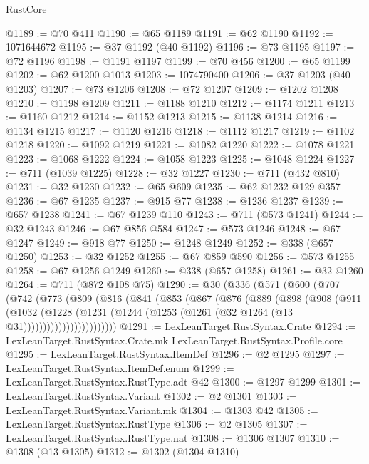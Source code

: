 \begin{lexlean}{RustCore}
\begin{coremodule}
@1189 := @70 @411
@1190 := @65 @1189
@1191 := @62 @1190
@1192 := 1071644672
@1195 := @37 @1192 (@40 @1192)
@1196 := @73 @1195
@1197 := @72 @1196
@1198 := @1191 @1197
@1199 := @70 @456
@1200 := @65 @1199
@1202 := @62 @1200 @1013
@1203 := 1074790400
@1206 := @37 @1203 (@40 @1203)
@1207 := @73 @1206
@1208 := @72 @1207
@1209 := @1202 @1208
@1210 := @1198 @1209
@1211 := @1188 @1210
@1212 := @1174 @1211
@1213 := @1160 @1212
@1214 := @1152 @1213
@1215 := @1138 @1214
@1216 := @1134 @1215
@1217 := @1120 @1216
@1218 := @1112 @1217
@1219 := @1102 @1218
@1220 := @1092 @1219
@1221 := @1082 @1220
@1222 := @1078 @1221
@1223 := @1068 @1222
@1224 := @1058 @1223
@1225 := @1048 @1224
@1227 := @711 (@1039 @1225)
@1228 := @32 @1227
@1230 := @711 (@432 @810)
@1231 := @32 @1230
@1232 := @65 @609
@1235 := @62 @1232 @129 @357
@1236 := @67 @1235
@1237 := @915 @77
@1238 := @1236 @1237
@1239 := @657 @1238
@1241 := @67 @1239 @110
@1243 := @711 (@573 @1241)
@1244 := @32 @1243
@1246 := @67 @856 @584
@1247 := @573 @1246
@1248 := @67 @1247
@1249 := @918 @77
@1250 := @1248 @1249
@1252 := @338 (@657 @1250)
@1253 := @32 @1252
@1255 := @67 @859 @590
@1256 := @573 @1255
@1258 := @67 @1256 @1249
@1260 := @338 (@657 @1258)
@1261 := @32 @1260
@1264 := @711 (@872 @108 @75)
@1290 := @30
    (@336
      (@571
        (@600
          (@707
            (@742
              (@773
                (@809
                  (@816
                    (@841
                      (@853
                        (@867
                          (@876
                            (@889
                              (@898
                                (@908
                                  (@911
                                    (@1032
                                      (@1228
                                        (@1231
                                          (@1244
                                            (@1253
                                              (@1261 (@32 @1264 (@13 @31))))))))))))))))))))))))
@1291 := LexLeanTarget.RustSyntax.Crate
@1294 := LexLeanTarget.RustSyntax.Crate.mk LexLeanTarget.RustSyntax.Profile.core
@1295 := LexLeanTarget.RustSyntax.ItemDef
@1296 := @2 @1295
@1297 := LexLeanTarget.RustSyntax.ItemDef.enum
@1299 := LexLeanTarget.RustSyntax.RustType.adt @42
@1300 := @1297 @1299
@1301 := LexLeanTarget.RustSyntax.Variant
@1302 := @2 @1301
@1303 := LexLeanTarget.RustSyntax.Variant.mk
@1304 := @1303 @42
@1305 := LexLeanTarget.RustSyntax.RustType
@1306 := @2 @1305
@1307 := LexLeanTarget.RustSyntax.RustType.nat
@1308 := @1306 @1307
@1310 := @1308 (@13 @1305)
@1312 := @1302 (@1304 @1310)

\end{coremodule}
\end{lexlean}

